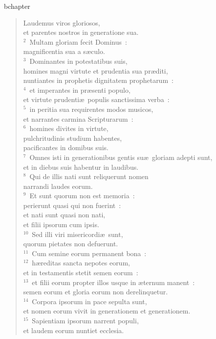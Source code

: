 bchapter\begin{verse}\vspace{-19pt}Laudemus viros gloriosos,\\ et parentes nostros in generatione sua.\\
${}^{2}$~Multam gloriam fecit Dominus~:\\ magnificentia sua a s\ae culo.\\
${}^{3}$~Dominantes in potestatibus suis,\\ homines magni virtute et prudentia sua pr\ae diti,\\ nuntiantes in prophetis dignitatem prophetarum~:\\
${}^{4}$~et imperantes in pr\ae senti populo,\\ et virtute prudenti\ae\ populis sanctissima verba~:\\
${}^{5}$~in peritia sua requirentes modos musicos,\\ et narrantes carmina Scripturarum~:\\
${}^{6}$~homines divites in virtute,\\ pulchritudinis studium habentes,\\ pacificantes in domibus suis.\\
${}^{7}$~Omnes isti in generationibus gentis su\ae\ gloriam adepti sunt,\\ et in diebus suis habentur in laudibus.\\
${}^{8}$~Qui de illis nati sunt reliquerunt nomen\\ narrandi laudes eorum.\\
${}^{9}$~Et sunt quorum non est memoria~:\\ perierunt quasi qui non fuerint~:\\ et nati sunt quasi non nati,\\ et filii ipsorum cum ipsis.\\
${}^{10}$~Sed illi viri misericordi\ae\ sunt,\\ quorum pietates non defuerunt.\\
${}^{11}$~Cum semine eorum permanent bona~:\\
${}^{12}$~h\ae reditas sancta nepotes eorum,\\ et in testamentis stetit semen eorum~:\\
${}^{13}$~et filii eorum propter illos usque in \ae ternum manent~:\\ semen eorum et gloria eorum non derelinquetur.\\
${}^{14}$~Corpora ipsorum in pace sepulta sunt,\\ et nomen eorum vivit in generationem et generationem.\\
${}^{15}$~Sapientiam ipsorum narrent populi,\\ et laudem eorum nuntiet ecclesia.\end{verse}



